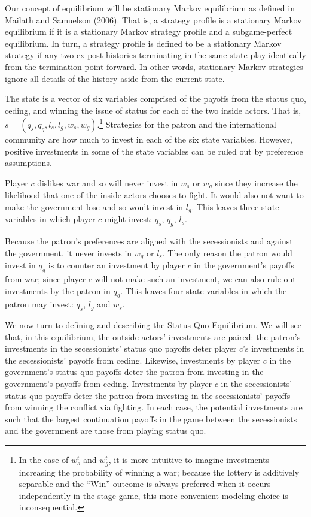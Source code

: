 \documentclass[11pt,letterpaper, notitlepage]{article}
\begin{document}
Our concept of equilibrium will be stationary Markov equilibrium as defined in Mailath and Samuelson (2006). That is, a strategy profile is a stationary Markov equilibrium if it is a stationary Markov strategy profile and a subgame-perfect equilibrium. In turn, a strategy profile is defined to be a stationary Markov strategy if any two ex post histories terminating in the same state play identically from the termination point forward. In other words, stationary Markov strategies ignore all details of the history aside from the current state.

The state is a vector of six variables comprised of the payoffs from the status quo, ceding, and winning the issue of status for each of the two inside actors. That is, $s = \left(q_s,q_g,l_s,l_g,w_s,w_g \right)$.\footnote{In the case of $w_s^t$ and $w_g^t$, it is more intuitive to imagine investments increasing the probability of winning a war; because the lottery is additively separable and the ``Win'' outcome is always preferred when it occurs independently in the stage game, this more convenient modeling choice is inconsequential.} Strategies for the patron and the international community are how much to invest in each of the six state variables. However, positive investments in some of the state variables can be ruled out by preference assumptions.

Player $c$ dislikes war and so will never invest in $w_s$ or $w_g$ since they increase the likelihood that one of the inside actors chooses to fight. It would also not want to make the government lose and so won't invest in $l_g$. This leaves three state variables in which player $c$ might invest: $q_s$, $q_g$, $l_s$.

Because the patron's preferences are aligned with the secessionists and against the government, it never invests in $w_g$ or $l_s$. The only reason the patron would invest in $q_g$ is to counter an investment by player $c$ in the government's payoffs from war; since player $c$ will not make such an investment, we can also rule out investments by the patron in $q_g$. This leaves four state variables in which the patron may invest: $q_s$, $l_g$ and $w_s$.

We now turn to defining and describing the Status Quo Equilibrium. We will see that, in this equilibrium, the outside actors' investments are paired: the patron's investments in the secessionists' status quo payoffs deter player $c$'s investments in the secessionists' payoffs from ceding. Likewise, investments by player $c$ in the government's status quo payoffs deter the patron from investing in the government's payoffs from ceding. Investments by player $c$ in the secessionists' status quo payoffs deter the patron from investing in the secessionists' payoffs from winning the conflict via fighting. In each case, the potential  investments are such that the largest continuation payoffs in the game between the secessionists and the government are those from playing status quo.
\end{document}
